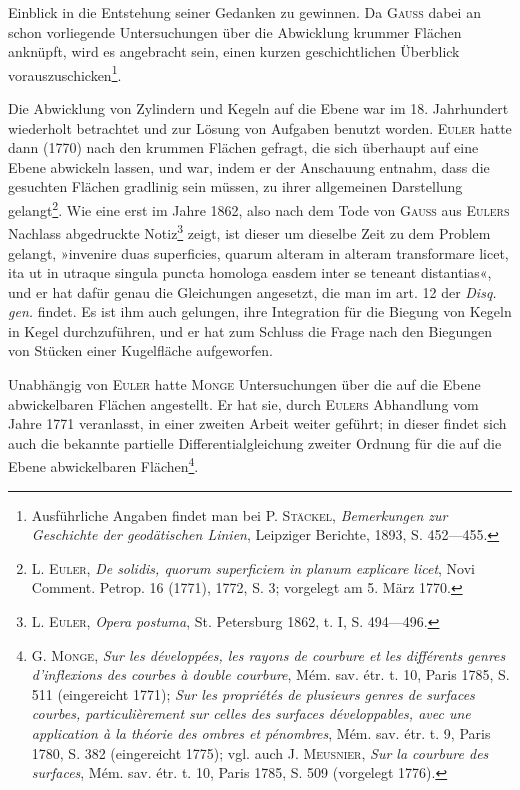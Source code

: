 Einblick in die Entstehung seiner Gedanken zu gewinnen. Da \textsc{Gauss} dabei
an schon vorliegende Untersuchungen über die Abwicklung krummer Flächen
anknüpft, wird es angebracht sein, einen kurzen geschichtlichen Überblick
vorauszuschicken\footnote{Ausführliche Angaben findet man bei \textsc{P. Stäckel}, \textit{Bemerkungen zur Geschichte der geodätischen Linien}, Leipziger Berichte, 1893, S. 452—455.}.
\par
Die Abwicklung von Zylindern und Kegeln auf die Ebene war im 18.
Jahrhundert wiederholt betrachtet und zur Lösung von Aufgaben benutzt
worden. \textsc{Euler} hatte dann (1770) nach den krummen Flächen gefragt, die
sich überhaupt auf eine Ebene abwickeln lassen, und war, indem er der Anschauung
entnahm, dass die gesuchten Flächen gradlinig sein müssen, zu ihrer
allgemeinen Darstellung gelangt\footnote{\textsc{L. Euler}, \textit{De solidis, quorum superficiem in planum explicare licet}, Novi Comment. Petrop. 16 (1771), 1772, S. 3; vorgelegt am 5. März 1770.}. Wie eine erst im Jahre 1862, also nach dem
Tode von \textsc{Gauss} aus \textsc{Eulers} Nachlass abgedruckte Notiz\footnote{\textsc{L. Euler}, \textit{Opera postuma}, St. Petersburg 1862, t. I, S. 494—496.} zeigt, ist dieser um
dieselbe Zeit zu dem Problem gelangt, »invenire duas superficies, quarum
alteram in alteram transformare licet, ita ut in utraque singula puncta homologa
easdem inter se teneant distantias«, und er hat dafür genau die Gleichungen
angesetzt, die man im art. 12 der \textit{Disq. gen.} findet. Es ist ihm auch
gelungen, ihre Integration für die Biegung von Kegeln in Kegel durchzuführen,
und er hat zum Schluss die Frage nach den Biegungen von Stücken einer
Kugelfläche aufgeworfen.
\par
Unabhängig von \textsc{Euler} hatte \textsc{Monge} Untersuchungen über die auf die
Ebene abwickelbaren Flächen angestellt. Er hat sie, durch \textsc{Eulers} Abhandlung
vom Jahre 1771 veranlasst, in einer zweiten Arbeit weiter geführt; in
\clearpage{}\setcounter{footnote}{0}
\noindent dieser findet sich auch die bekannte partielle Differentialgleichung zweiter
Ordnung für die auf die Ebene abwickelbaren Flächen\footnote{\textsc{G. Monge}, \textit{Sur les développées, les rayons de courbure et les différents genres d’inflexions des courbes à double courbure}, Mém. sav. étr. t. 10, Paris 1785, S. 511 (eingereicht 1771); \textit{Sur les propriétés de plusieurs genres de surfaces courbes, particulièrement sur celles des surfaces développables, avec une application à la théorie des ombres et pénombres}, Mém. sav. étr. t. 9, Paris 1780, S. 382 (eingereicht 1775); vgl. auch \textsc{J. Meusnier}, \textit{Sur la courbure des surfaces}, Mém. sav. étr. t. 10, Paris 1785, S. 509 (vorgelegt 1776).}.
